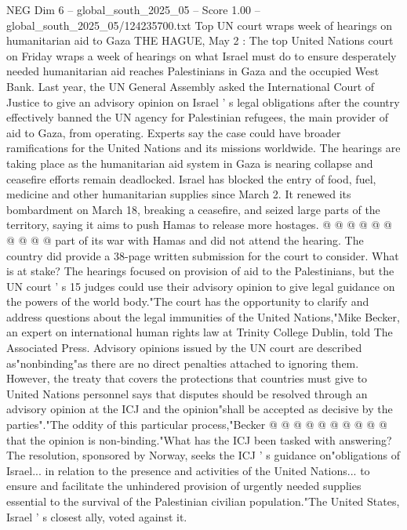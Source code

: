 \begin{textsample}{NEG Dim 6 – global\_south\_2025\_05 – Score 1.00 – global\_south\_2025\_05/124235700.txt}  \label{ex:f6_neg_392}
Top UN court wraps week of hearings on humanitarian aid to Gaza THE HAGUE, May 2 : The top United Nations court on Friday wraps a week of hearings on what Israel must do to ensure desperately needed humanitarian aid reaches Palestinians in Gaza and the occupied West Bank.
Last year, the UN General Assembly asked the International Court of Justice to give an advisory opinion on Israel ' s legal obligations after the country effectively banned the UN agency for Palestinian refugees, the main provider of aid to Gaza, from operating.
Experts say the case could have broader ramifications for the United Nations and its missions worldwide.
The hearings are taking place as the humanitarian aid system in Gaza is nearing collapse and ceasefire efforts remain deadlocked.
Israel has blocked the entry of food, fuel, medicine and other humanitarian supplies since March 2.
It renewed its bombardment on March 18, breaking a ceasefire, and seized large parts of the territory, saying it aims to push Hamas to release more hostages. @ @ @ @ @ @ @ @ @ @ part of its war with Hamas and did not attend the hearing.
The country did provide a 38-page written submission for the court to consider.
What is at stake?
The hearings focused on provision of aid to the Palestinians, but the UN court ' s 15 judges could use their advisory opinion to give legal guidance on the powers of the world body."The court has the opportunity to clarify and address questions about the legal immunities of the United Nations,"Mike Becker, an expert on international human rights law at Trinity College Dublin, told The Associated Press.
Advisory opinions issued by the UN court are described as"nonbinding"as there are no direct penalties attached to ignoring them.
However, the treaty that covers the protections that countries must give to United Nations personnel says that disputes should be resolved through an advisory opinion at the ICJ and the opinion"shall be accepted as decisive by the parties"."The oddity of this particular process,"Becker @ @ @ @ @ @ @ @ @ @ that the opinion is non-binding."What has the ICJ been tasked with answering?
The resolution, sponsored by Norway, seeks the ICJ ' s guidance on"obligations of Israel... in relation to the presence and activities of the United Nations... to ensure and facilitate the unhindered provision of urgently needed supplies essential to the survival of the Palestinian civilian population."The United States, Israel ' s closest ally, voted against it.

\end{textsample}
